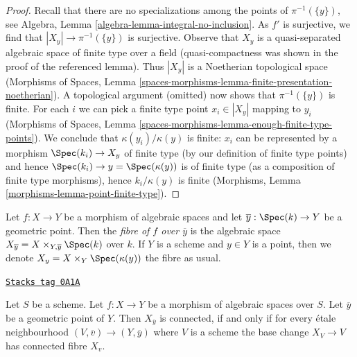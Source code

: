 \begin{proof}
Recall that there are no specializations among the points of $\pi^{-1}(\{y\})$,
see Algebra, Lemma \ref{algebra-lemma-integral-no-inclusion}.
As $f'$ is surjective, we find that $|X_y| \to \pi^{-1}(\{y\})$ is surjective.
Observe that $X_y$ is a quasi-separated algebraic space of finite type
over a field (quasi-compactness was shown in the proof of the
referenced lemma). Thus $|X_y|$ is a Noetherian topological space
(Morphisms of Spaces, Lemma
\ref{spaces-morphisms-lemma-finite-presentation-noetherian}).
A topological argument (omitted) now shows that $\pi^{-1}(\{y\})$ is finite.
For each $i$ we can pick a finite type point $x_i \in |X_y|$
mapping to $y_i$ (Morphisms of Spaces, Lemma
\ref{spaces-morphisms-lemma-enough-finite-type-points}).
We conclude that $\kappa(y_i)/\kappa(y)$ is finite:
$x_i$ can be represented by a morphism $\Spec(k_i) \to X_y$
of finite type (by our definition of finite type points)
and hence $\Spec(k_i) \to y = \Spec(\kappa(y))$ is of finite type
(as a composition of finite type morphisms),
hence $k_i/\kappa(y)$ is finite (Morphisms, Lemma
\ref{morphisms-lemma-point-finite-type}).
\end{proof}

Let $f : X \to Y$ be a morphism of algebraic spaces and let
$\overline{y} : \Spec(k) \to Y$ be a geometric point. Then the
{\it fibre of $f$ over $\overline{y}$} is the algebraic space
$X_{\overline{y}} = X \times_{Y, \overline{y}} \Spec(k)$ over $k$.
If $Y$ is a scheme and $y \in Y$ is a point, then we denote
$X_y = X \times_Y \Spec(\kappa(y))$ the fibre as usual.

\begin{lemma}
\label{spaces-more-morphisms-lemma-characterize-geometrically-connected-fibres}
\href{https://stacks.math.columbia.edu/tag/0A1A}{\texttt{Stacks tag 0A1A}}

Let $S$ be a scheme. Let $f : X \to Y$ be a morphism of algebraic spaces
over $S$. Let $\overline{y}$ be a geometric point of $Y$. Then
$X_{\overline{y}}$ is connected, if and only if for every \'etale
neighbourhood $(V, \overline{v}) \to (Y, \overline{y})$ where $V$
is a scheme the base change $X_V \to V$ has connected fibre $X_v$.
\end{lemma}

